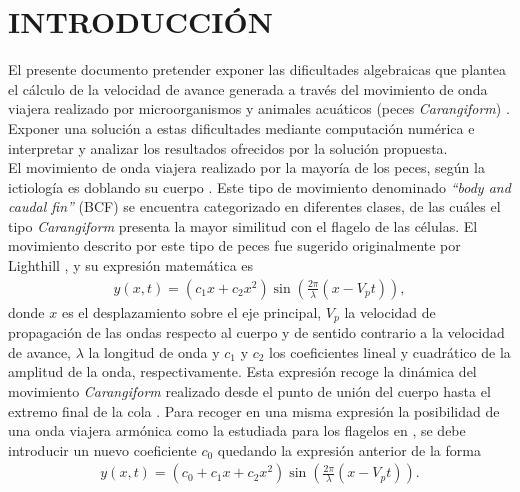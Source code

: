 \section{INTRODUCCIÓN} \label{sec:Introduccion}
El presente documento pretender exponer las dificultades algebraicas que plantea el cálculo de la velocidad de avance generada a través del movimiento de onda viajera realizado por microorganismos \cite{Gray1955} y animales acuáticos (peces \textit{Carangiform}) \cite{Korkmaz2012,Korkmaz2011}. Exponer una solución a estas dificultades mediante computación numérica e interpretar y analizar los resultados ofrecidos por la solución propuesta.\\

El movimiento de onda viajera realizado por la mayoría de los peces, según la ictiología es doblando su cuerpo \cite{modeswim}. Este tipo de movimiento denominado \textit{``body and caudal fin''} (BCF) se encuentra categorizado en diferentes clases, de las cuáles el tipo \textit{Carangiform}  presenta la mayor similitud con el flagelo de las células. El movimiento descrito por este tipo de peces fue sugerido originalmente por Lighthill \cite{FLM:368244}, y su expresión matemática es
\begin{eqnarray}
	\label{eq:fish_traveling_wave}
	y (x,t) = (c_1 x + c_2 x^2) \sin \left( \frac{2 \pi}{\lambda}  ( x - V_p t) \right),
\end{eqnarray}
donde $x$ es el desplazamiento sobre el eje principal, $V_p$ la velocidad de propagación de las ondas respecto al cuerpo y de sentido contrario a la velocidad de avance, $\lambda$ la longitud de onda y $c_1$ y $c_2$ los coeficientes lineal y cuadrático de la amplitud de la onda, respectivamente. Esta expresión recoge la dinámica del movimiento \textit{Carangiform} realizado desde el punto de unión del cuerpo hasta el extremo final de la cola \cite{Robotic_Fish,Robotic_Fish_speed,Robotic_Fish_3D}. Para recoger en una misma expresión la posibilidad de una onda viajera armónica como la estudiada para los flagelos en \cite{gray1955propulsion}, se debe introducir un nuevo coeficiente $c_0$ quedando la expresión anterior de la forma
\begin{eqnarray}
	\label{eq:flag_fish_traveling_wave}
	y (x,t) = (c_0+c_1 x + c_2 x^2) \sin \left( \frac{2 \pi}{\lambda}  ( x - V_p t) \right).
\end{eqnarray}

